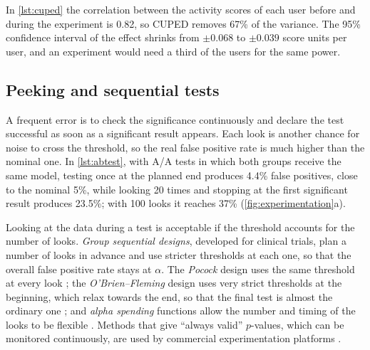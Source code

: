In \cref{lst:cuped} the correlation between the activity scores of each user before and during the experiment is 0.82, so CUPED removes 67\% of
the variance. The 95\% confidence interval of the effect shrinks from $\pm0.068$ to $\pm0.039$ score units per user, and an experiment would
need a third of the users for the same power.

\subsection{Peeking and sequential tests\extsec}

A frequent error is to check the significance continuously and declare the test successful as soon as a significant result appears. Each look
is another chance for noise to cross the threshold, so the real false positive rate is much higher than the nominal one. In
\cref{lst:abtest}, with A/A tests in which both groups receive the same model, testing once at the planned end produces 4.4\% false
positives, close to the nominal 5\%, while looking 20 times and stopping at the first significant result produces 23.5\%; with 100 looks it
reaches 37\% (\cref{fig:experimentation}a).

Looking at the data during a test is acceptable if the threshold accounts for the number of looks. \emph{Group sequential designs}, developed for clinical trials, plan
a number of looks in advance and use stricter thresholds at each one, so that the overall false positive rate stays at $\alpha$. The
\emph{Pocock} design uses the same threshold at every look \citep{pocock1977group}; the \emph{O'Brien--Fleming} design uses very strict
thresholds at the beginning, which relax towards the end, so that the final test is almost the ordinary one
\citep{obrien1979multiple}; and \emph{alpha spending} functions allow the number and timing of the looks to be flexible
\citep{lan1983discrete}. Methods that give ``always valid'' $p$-values, which can be monitored continuously, are used by commercial
experimentation platforms \citep{johari2017peeking}.

